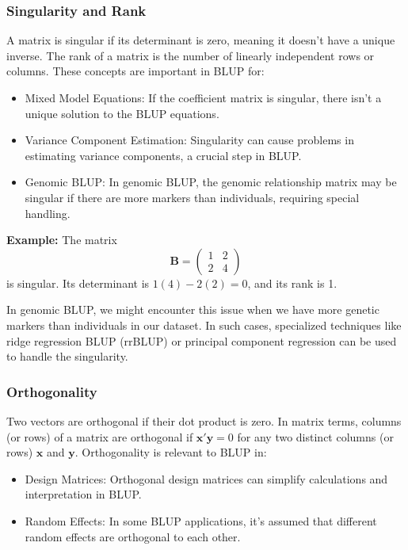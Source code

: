 \documentclass[12pt,a4paper]{article}
\begin{document}
\subsubsection{Singularity and Rank}

A matrix is singular if its determinant is zero, meaning it doesn't have a unique inverse. The rank of a matrix is the number of linearly independent rows or columns. These concepts are important in BLUP for:

\begin{itemize}
\item Mixed Model Equations: If the coefficient matrix is singular, there isn't a unique solution to the BLUP equations.
\item Variance Component Estimation: Singularity can cause problems in estimating variance components, a crucial step in BLUP.
\item Genomic BLUP: In genomic BLUP, the genomic relationship matrix may be singular if there are more markers than individuals, requiring special handling.
\end{itemize}

\textbf{Example:}
The matrix $$\mathbf{B} = \begin{pmatrix} 1 & 2 \\ 2 & 4 \end{pmatrix}$$ is singular.
Its determinant is $1(4) - 2(2) = 0$, and its rank is 1.

In genomic BLUP, we might encounter this issue when we have more genetic markers than individuals in our dataset. In such cases, specialized techniques like ridge regression BLUP (rrBLUP) or principal component regression can be used to handle the singularity.

\subsubsection{Orthogonality}

Two vectors are orthogonal if their dot product is zero. In matrix terms, columns (or rows) of a matrix are orthogonal if $\mathbf{x}'\mathbf{y} = 0$ for any two distinct columns (or rows) $\mathbf{x}$ and $\mathbf{y}$. Orthogonality is relevant to BLUP in:

\begin{itemize}
\item Design Matrices: Orthogonal design matrices can simplify calculations and interpretation in BLUP.
\item Random Effects: In some BLUP applications, it's assumed that different random effects are orthogonal to each other.
\end{itemize}
\end{document}
